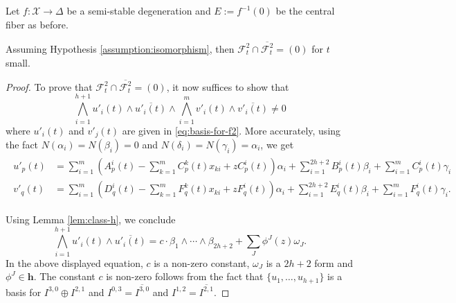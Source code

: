 Let \(f\colon\mathcal{X}\to\Delta\) be a semi-stable degeneration
and \(E:=f^{-1}(0)\) be the central fiber as before. 

\begin{proposition}
Assuming Hypothesis \ref{assumption:isomorphism}, then \(\mathcal{F}^{2}_{t}\cap 
\overline{\mathcal{F}^{2}_{t}}=(0)\) for \(t\) small.
\end{proposition}
\begin{proof}
To prove that \(\mathcal{F}^{2}_{t}\cap 
\overline{\mathcal{F}^{2}_{t}}=(0)\), it now suffices to show that 
\begin{equation}
\bigwedge_{i=1}^{h+1} u'_{i}(t)\wedge\overline{u'_{i}(t)}\wedge
\bigwedge_{i=1}^{m} v'_{i}(t)\wedge\overline{v'_{i}(t)}\ne 0
\end{equation}
where \(u'_{i}(t)\) and \(v'_{j}(t)\) are given in \eqref{eq:basis-for-f2}.
More accurately, using the fact \(N(\alpha_{i})=N(\beta_{i})=0\)
and \(N(\delta_{i})=N(\gamma_{i})=\alpha_{i}\), we get
\begin{align*}
\begin{split}
u'_{p}(t)&=\sum_{i=1}^{m} \left(A^{i}_{p}(t)-\sum_{k=1}^{m}C_{p}^{k}(t)x_{ki}
+zC_{p}^{i}(t)\right) \alpha_{i}+
\sum_{i=1}^{2h+2} B^{i}_{p}(t) \beta_{i} + \sum_{i=1}^{m} C^{i}_{p}(t) \gamma_{i}\\
v'_{q}(t)&=\sum_{i=1}^{m} \left(D^{i}_{q}(t)-\sum_{k=1}^{m}F_{q}^{k}(t)x_{ki}
+zF_{q}^{i}(t)\right) \alpha_{i}+
\sum_{i=1}^{2h+2} E^{i}_{q}(t) \beta_{i} + \sum_{i=1}^{m} F^{i}_{q}(t) \gamma_{i}.
\end{split}
\end{align*}

Using Lemma \ref{lem:class-h}, we conclude
\begin{equation}
\label{eq:dominant-term-in-middle}
\bigwedge_{i=1}^{h+1} u'_{i}(t)\wedge\overline{u'_{i}(t)}=
c\cdot\beta_{1}\wedge\cdots\wedge\beta_{2h+2} + \sum_{J} \phi^{J}(z)\omega_{J}.
\end{equation}
In the above displayed equation, \(c\) is a non-zero constant, \(\omega_{J}\)
is a \(2h+2\) form and \(\phi^{J}\in\mathbf{h}\).
The constant \(c\) is non-zero follows from the fact that 
\(\{u_{1},\ldots,u_{h+1}\}\) is a basis for \(I^{3,0}\oplus I^{2,1}\) and 
\(I^{0,3}=\overline{I^{3,0}}\) and \(I^{1,2}=\overline{I^{2,1}}\).


\end{proof}
